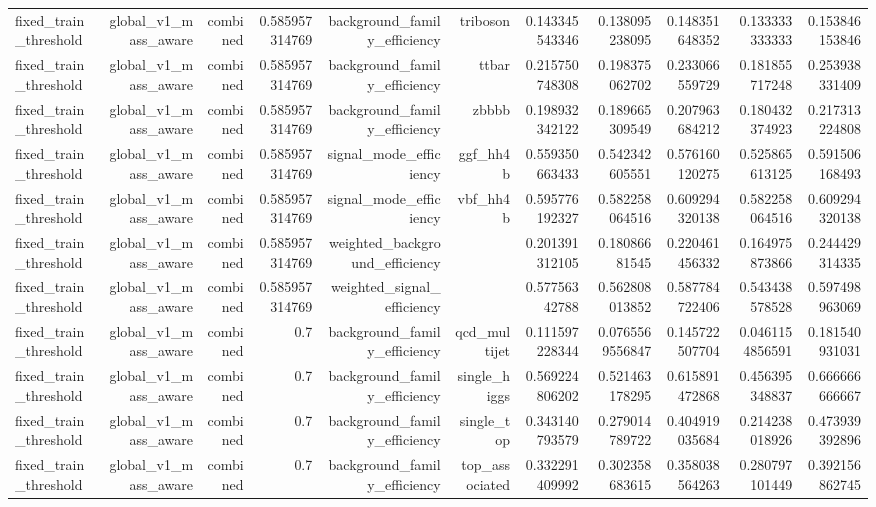 \begin{table}[htbp]
{\begin{tabular}{lrrrrrrrrrr}
fixed\_train\_threshold & global\_v1\_mass\_aware & combined & 0.585957314769 & background\_family\_efficiency & triboson & 0.143345543346 & 0.138095238095 & 0.148351648352 & 0.133333333333 & 0.153846153846 \\
fixed\_train\_threshold & global\_v1\_mass\_aware & combined & 0.585957314769 & background\_family\_efficiency & ttbar & 0.215750748308 & 0.198375062702 & 0.233066559729 & 0.181855717248 & 0.253938331409 \\
fixed\_train\_threshold & global\_v1\_mass\_aware & combined & 0.585957314769 & background\_family\_efficiency & zbbbb & 0.198932342122 & 0.189665309549 & 0.207963684212 & 0.180432374923 & 0.217313224808 \\
fixed\_train\_threshold & global\_v1\_mass\_aware & combined & 0.585957314769 & signal\_mode\_efficiency & ggf\_hh4b & 0.559350663433 & 0.542342605551 & 0.576160120275 & 0.525865613125 & 0.591506168493 \\
fixed\_train\_threshold & global\_v1\_mass\_aware & combined & 0.585957314769 & signal\_mode\_efficiency & vbf\_hh4b & 0.595776192327 & 0.582258064516 & 0.609294320138 & 0.582258064516 & 0.609294320138 \\
fixed\_train\_threshold & global\_v1\_mass\_aware & combined & 0.585957314769 & weighted\_background\_efficiency &  & 0.201391312105 & 0.18086681545 & 0.220461456332 & 0.164975873866 & 0.244429314335 \\
fixed\_train\_threshold & global\_v1\_mass\_aware & combined & 0.585957314769 & weighted\_signal\_efficiency &  & 0.57756342788 & 0.562808013852 & 0.587784722406 & 0.543438578528 & 0.597498963069 \\
fixed\_train\_threshold & global\_v1\_mass\_aware & combined & 0.7 & background\_family\_efficiency & qcd\_multijet & 0.111597228344 & 0.0765569556847 & 0.145722507704 & 0.0461154856591 & 0.181540931031 \\
fixed\_train\_threshold & global\_v1\_mass\_aware & combined & 0.7 & background\_family\_efficiency & single\_higgs & 0.569224806202 & 0.521463178295 & 0.615891472868 & 0.456395348837 & 0.666666666667 \\
fixed\_train\_threshold & global\_v1\_mass\_aware & combined & 0.7 & background\_family\_efficiency & single\_top & 0.343140793579 & 0.279014789722 & 0.404919035684 & 0.214238018926 & 0.473939392896 \\
fixed\_train\_threshold & global\_v1\_mass\_aware & combined & 0.7 & background\_family\_efficiency & top\_associated & 0.332291409992 & 0.302358683615 & 0.358038564263 & 0.280797101449 & 0.392156862745 \\

\end{tabular}}
\end{table}
